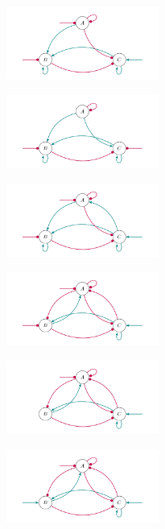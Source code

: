 \documentclass[varwidth=18cm, border=10pt]{standalone}
\begin{document}
\begin{figure}
\begin{subfigure}{6cm}
\caption{}
\end{subfigure}
\begin{subfigure}{6cm}
\centering\includegraphics[width=5cm]{moomppppmmmpp.pdf}
\caption{}
\end{subfigure}
\begin{subfigure}{6cm}
\centering\includegraphics[width=5cm]{moooppppmpmpm.pdf}
\caption{}
\end{subfigure}
\begin{subfigure}{6cm}
\centering\includegraphics[width=5cm]{mopmppppmmmpp.pdf}
\caption{}
\end{subfigure}
\begin{subfigure}{6cm}
\centering\includegraphics[width=5cm]{mpmmpmopmmmpp.pdf}
\caption{}
\end{subfigure}
\begin{subfigure}{6cm}
\centering\includegraphics[width=5cm]{mpmmpmopommpp.pdf}
\caption{}
\end{subfigure}
\begin{subfigure}{6cm}
\centering\includegraphics[width=5cm]{mpmmpmoppmmpp.pdf}

\end{subfigure}
\end{figure}
\end{document}
